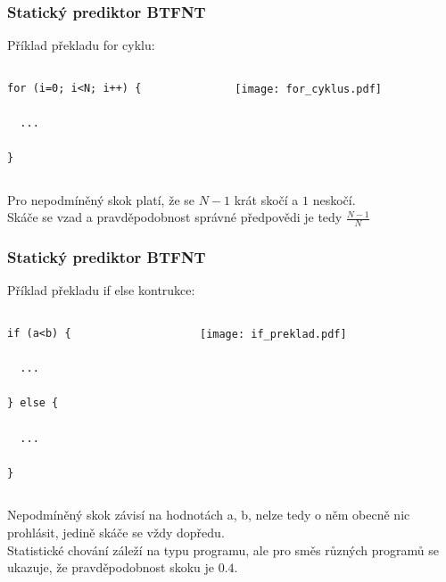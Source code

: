 \documentclass{beamer}
\begin{document}
\begin{frame}[fragile]
\frametitle{Statický prediktor BTFNT}

Příklad překladu for cyklu:

\begin{columns}[T]
\begin{column}{0.4\textwidth}
\begin{verbatim}
for (i=0; i<N; i++) {

  ...
  
}
\end{verbatim}
\end{column}
\begin{column}{0.6\textwidth}
\texttt{[image: for\_cyklus.pdf]}
\end{column}
\end{columns}
\bigskip
Pro nepodmíněný skok platí, že se $N-1$ krát skočí a $1$ neskočí.\\
Skáče se vzad a pravděpodobnost správné předpovědi je tedy $\frac{N-1}{N}$

\end{frame}

\begin{frame}[fragile]
\frametitle{Statický prediktor BTFNT}

Příklad překladu if else kontrukce:

\begin{columns}[T]
\begin{column}{0.4\textwidth}
\begin{verbatim}
if (a<b) {
  
  ...

} else {

  ...

}
\end{verbatim}
\end{column}
\begin{column}{0.6\textwidth}
\texttt{[image: if\_preklad.pdf]}
\end{column}
\end{columns}
\bigskip
Nepodmíněný skok závisí na hodnotách a, b, nelze tedy o něm obecně nic prohlásit, jedině skáče se vždy dopředu.\\
Statistické chování záleží na typu programu, ale pro směs různých programů se ukazuje, že pravděpodobnost skoku je $0.4$.

\end{frame}
\end{document}
